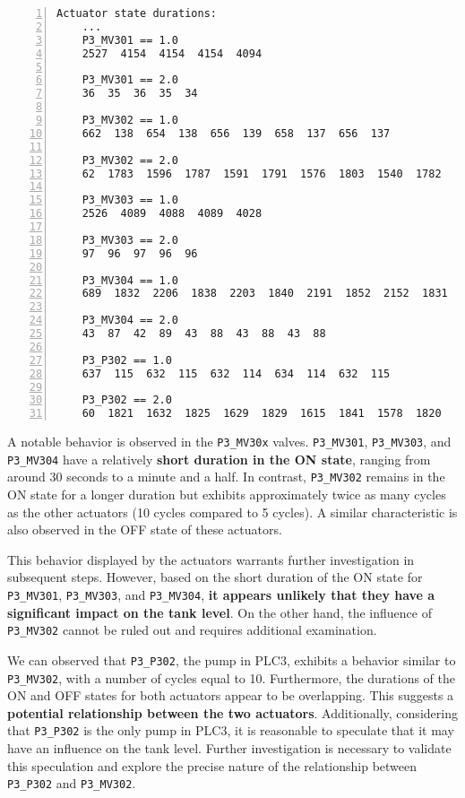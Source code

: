 \begin{lstlisting}[language=bash, numbers=left, caption=Time duration of the states of actuators of PLC3, label=lst:6_preproc_P2P3_actuator_duration]
	Actuator state durations:
	...
	P3_MV301 == 1.0
	2527  4154  4154  4154  4094
	
	P3_MV301 == 2.0
	36  35  36  35  34
	
	P3_MV302 == 1.0
	662  138  654  138  656  139  658  137  656  137
	
	P3_MV302 == 2.0
	62  1783  1596  1787  1591  1791  1576  1803  1540  1782
	
	P3_MV303 == 1.0
	2526  4089  4088  4089  4028
	
	P3_MV303 == 2.0
	97  96  97  96  96
		
	P3_MV304 == 1.0
	689  1832  2206  1838  2203  1840  2191  1852  2152  1831
	
	P3_MV304 == 2.0
	43  87  42  89  43  88  43  88  43  88
	
	P3_P302 == 1.0
	637  115  632  115  632  114  634  114  632  115
	
	P3_P302 == 2.0
	60  1821  1632  1825  1629  1829  1615  1841  1578  1820
\end{lstlisting}

A notable behavior is observed in the \texttt{P3\_MV30x} valves. \texttt{P3\_MV301}, \texttt{P3\_MV303}, and \texttt{P3\_MV304} have a relatively \textbf{short duration in the ON state}, ranging from around 30 seconds to a minute and a half. In contrast, \texttt{P3\_MV302} remains in the ON state for a longer duration but exhibits approximately twice as many cycles as the other actuators (10 cycles compared to 5 cycles). A similar characteristic is also observed in the OFF state of these actuators.

This behavior displayed by the actuators warrants further investigation in subsequent steps. However, based on the short duration of the ON state for \texttt{P3\_MV301}, \texttt{P3\_MV303}, and \texttt{P3\_MV304}, \textbf{it appears unlikely that they have a significant impact on the tank level}. On the other hand, the influence of \texttt{P3\_MV302} cannot be ruled out and requires additional examination.

\bigskip
We can observed that \texttt{P3\_P302}, the pump in PLC3, exhibits a behavior similar to \texttt{P3\_MV302}, with a number of cycles equal to 10. Furthermore, the durations of the ON and OFF states for both actuators appear to be overlapping. This suggests a \textbf{potential relationship between the two actuators}. Additionally, considering that \texttt{P3\_P302} is the only pump in PLC3, it is reasonable to speculate that it may have an influence on the tank level. Further investigation is necessary to validate this speculation and explore the precise nature of the relationship between \texttt{P3\_P302} and \texttt{P3\_MV302}.

